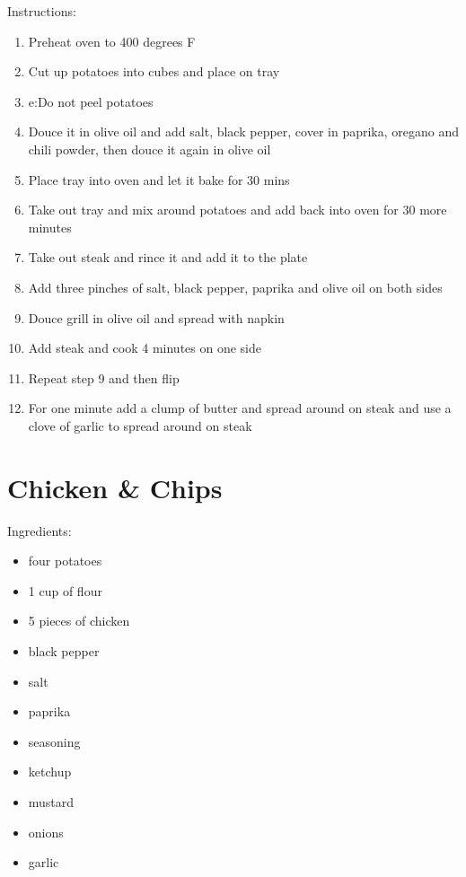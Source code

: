 \documentclass{article}
\begin{document}
Instructions:
\begin{enumerate}
    \item Preheat oven to 400 degrees F
    \item Cut up potatoes into cubes and place on tray
    \item e:Do not peel potatoes 
    \item Douce it in olive oil and add salt, black pepper, cover in paprika, oregano and chili powder, then douce it again in olive oil
    \item Place tray into oven and let it bake for 30 mins
    \item Take out tray and mix around potatoes and add back into oven for 30 more minutes
    \item Take out steak and rince it and add it to the plate
    \item Add three pinches of salt, black pepper, paprika and olive oil on both sides
    \item Douce grill in olive oil and spread with napkin
    \item Add steak and cook 4 minutes on one side 
    \item Repeat step 9 and then flip 
    \item For one minute add a clump of butter and spread around on steak and use a clove of garlic to spread around on steak

\end{enumerate}
\newpage


\section{Chicken \& Chips}

Ingredients:

\begin{itemize}
    \item four potatoes
    \item 1 cup of flour
    \item 5 pieces of chicken
    \item black pepper
    \item salt
    \item paprika
    \item seasoning
    \item ketchup
    \item mustard
    \item onions
    \item garlic

\end{itemize}
\end{document}
